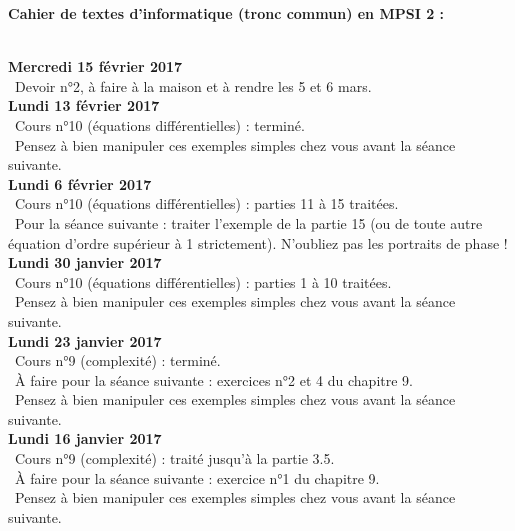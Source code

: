 \documentclass[12pt,a4paper]{article}
\begin{document}
\begin{center}
\Large\bf Cahier de textes d'informatique (tronc commun) en MPSI 2 :
\end{center}
\vspace{1cm}
\vspace{.4cm}\\

\noindent\textbf{Mercredi 15 février 2017}\\
\bu\ Devoir n°2, à faire à la maison et à rendre les 5 et 6 mars. \vspace{.4cm}\\

\noindent\textbf{Lundi 13 février 2017}\\
\bu\ Cours n°10 (équations différentielles) : terminé. \\
\bu\ Pensez à bien manipuler ces exemples simples chez vous avant la séance suivante. \vspace{.4cm}\\

\noindent\textbf{Lundi 6 février 2017}\\
\bu\ Cours n°10 (équations différentielles) : parties 11 à 15 traitées. \\
\bu\ Pour la séance suivante : traiter l'exemple de la partie 15 (ou de toute autre équation d'ordre supérieur à 1 strictement). N'oubliez pas les portraits de phase ! \vspace{.4cm}\\

\noindent\textbf{Lundi 30 janvier 2017}\\
\bu\ Cours n°10 (équations différentielles) : parties 1 à 10 traitées. \\
\bu\ Pensez à bien manipuler ces exemples simples chez vous avant la séance suivante. \vspace{.4cm}\\

\noindent\textbf{Lundi 23 janvier 2017}\\
\bu\ Cours n°9 (complexité) : terminé. \\
\bu\ À faire pour la séance suivante : exercices n°2 et 4 du chapitre 9.\\
\bu\ Pensez à bien manipuler ces exemples simples chez vous avant la séance suivante. \vspace{.4cm}\\

\noindent\textbf{Lundi 16 janvier 2017}\\
\bu\ Cours n°9 (complexité) : traité jusqu'à la partie 3.5. \\
\bu\ À faire pour la séance suivante : exercice n°1 du chapitre 9.\\
\bu\ Pensez à bien manipuler ces exemples simples chez vous avant la séance suivante. \vspace{.4cm}\\
\end{document}
